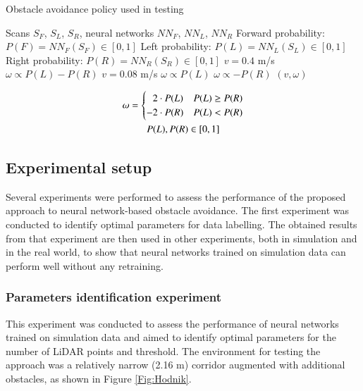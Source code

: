 \begin{algorithm}
\caption{Obstacle avoidance policy used in testing}
\label{Alg:Policy}
\begin{algorithmic}
	\renewcommand{\algorithmicrequire}{\textbf{Input:}}
    \renewcommand{\algorithmicensure}{\textbf{Output:}}
    \REQUIRE Scans $S_F$, $S_L$, $S_R$, neural networks $NN_F$, $NN_L$, $NN_R$
    \STATE Forward probability: $P(F) = NN_F(S_F) \in [0,1]$
    \STATE Left probability: $P(L) = NN_L(S_L) \in [0,1]$
    \STATE Right probability: $P(R) = NN_R(S_R) \in [0,1]$
    	\STATE $v=0.4$ m/s
        \STATE $\omega\propto P(L)-P(R)$
    \ELSE
    	\STATE $v=0.08$ m/s
        	\STATE $\omega\propto P(L)$
        \ELSE
        	\STATE $\omega\propto -P(R)$
        \ENDIF
    \ENDIF
    \ENSURE $(v,\omega)$
\end{algorithmic}
\end{algorithm}

\begin{gather}
    \label{eq:AngularVelocity}
    \omega = \begin{cases}
        \hphantom{-}2 \cdot P(L) & P(L) \geq P(R)\\
        -2 \cdot  P(R) & P(L) < P(R)
    \end{cases}\\
    P(L), P(R) \in [0,1] \nonumber
\end{gather}

\subsection{Experimental setup}

Several experiments were performed to assess the performance of the proposed approach to neural network-based obstacle avoidance. The first experiment was conducted to identify optimal parameters for data labelling. The obtained results from that experiment are then used in other experiments, both in simulation and in the real world, to show that neural networks trained on simulation data can perform well without any retraining.

\subsubsection{Parameters identification experiment}
\label{Sec:MMLabelling}

This experiment was conducted to assess the performance of neural networks trained on simulation data and aimed to identify optimal parameters for the number of LiDAR points and threshold. The environment for testing the approach was a relatively narrow (2.16 m) corridor augmented with additional obstacles, as shown in Figure \ref{Fig:Hodnik}.

